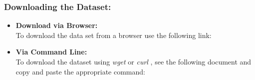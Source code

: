 \documentclass{article}
\begin{document}
\subsubsection*{Downloading the Dataset:}
\begin{itemize}
    \item \textbf{Download via Browser:}\\
        To download the data set from a browser use the following link:
        \begin{center}
        \href{https://drive.google.com/uc?export=download&id=1s9rt4xtLSjjnXSxR9MNqLHVC2DAkzsSp}{\color{blue}{https://drive.google.com/uc?export=download\&id=1s9rt4xtLSjjnXSxR9MNqLHVC2DAkzsSp}}
        \end{center}
    \item \textbf{Via Command Line:}\\
        To download the dataset using \textit{wget} or \textit{curl} , see the following document and copy and paste the appropriate command:
        \href{https://raw.githubusercontent.com/DaveedDomingo/Spark-Reddit-Netflix-Project/master/DownloadNetflixData.txt}{\color{blue}{https://raw.githubusercontent.com/DaveedDomingo/Spark-Reddit-Netflix-Project/master/DownloadNetflixData.txt}}
        

\end{itemize}
\end{document}
